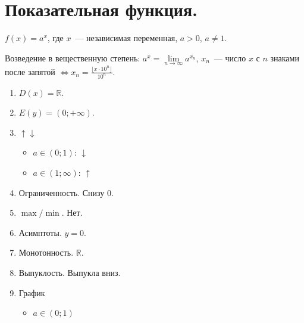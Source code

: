 \documentclass[12pt]{article}
\begin{document}
	\section{Показательная функция.}
	\begin{definition}
		$f(x) = a^x$, где $x$~--- независимая переменная, $a > 0$, $a \not= 1$.
	\end{definition}
	\begin{definition}
		Возведение в вещественную степень: $a^x = \lim\limits_{n \rightarrow \infty} a^{x_n}$, $x_n$~--- число $x$ с $n$ знаками после запятой $\Leftrightarrow x_n = \frac{\lfloor x \cdot 10^n \rfloor}{10^n}$.
	\end{definition}
	\begin{property}
		\begin{enumerate}
			\item $D(x) = \mathbb{R}$.
			\item $E(y) = (0; +\infty)$.
			\item $\uparrow \downarrow$
			\begin{itemize}
				\item $a \in (0; 1)$: $\downarrow$
				\item $a \in (1; \infty)$: $\uparrow$
			\end{itemize}
			\item Ограниченность. Снизу $0$.
			\item $\max/\min$. Нет.
			\item Асимптоты. $y = 0$.
			\item Монотонность. $\mathbb{R}$.
			\item Выпуклость. Выпукла вниз.
			\item График
			\begin{itemize}
				\item $a \in (0; 1)$
				\begin{figure}[H]
					\centering

\end{figure}
\end{itemize}
\end{enumerate}
\end{property}
\end{document}

